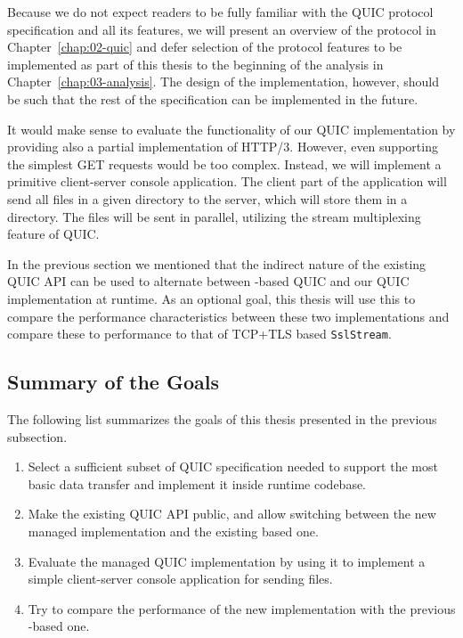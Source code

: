 Because we do not expect readers to be fully familiar with the QUIC protocol specification and all
its features, we will present an overview of the protocol in Chapter~\ref{chap:02-quic} and defer
selection of the protocol features to be implemented as part of this thesis to the beginning of the
analysis in Chapter~\ref{chap:03-analysis}. The design of the implementation, however, should be
such that the rest of the specification can be implemented in the future.

It would make sense to evaluate the functionality of our QUIC implementation by providing also a
partial implementation of HTTP/3. However, even supporting the simplest GET requests would be too
complex. Instead, we will implement a primitive client-server console application. The client part
of the application will send all files in a given directory to the server, which will store them in
a directory. The files will be sent in parallel, utilizing the stream multiplexing feature of
QUIC\@.

In the previous section we mentioned that the indirect nature of the existing QUIC API can be used
to alternate between \libmsquic{}-based QUIC and our QUIC implementation at runtime. As an optional
goal, this thesis will use this to compare the performance characteristics between these two
implementations and compare these to performance to that of TCP+TLS based \texttt{SslStream}.

\subsection*{Summary of the Goals}

The following list summarizes the goals of this thesis presented in the previous subsection.

\begin{enumerate}

  \item Select a sufficient subset of QUIC specification needed to support the most basic data
    transfer and implement it inside \dotnet{} runtime codebase.

  \item Make the existing QUIC API public, and allow switching between the new managed
    implementation and the existing \libmsquic{} based one.

  \item Evaluate the managed QUIC implementation by using it to implement a simple client-server
    console application for sending files.

  \item {} Try to compare the performance of the new
    implementation with the previous \libmsquic{}-based one.

\end{enumerate}
